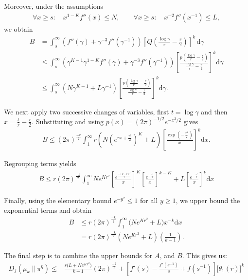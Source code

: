 \documentclass[10pt, journal]{IEEEtran}
\begin{document}
Moreover, under the assumptions
\begin{align*}
\forall x \ge s:\quad x^{1-K} f''(x) \le N,
\qquad
\forall x \ge s:\quad x^{-2} f''(x^{-1}) \le L,
\end{align*}
we obtain
\begin{align}
B &= \int_s^{\infty} \left(f''(\gamma) + \gamma^{-3} f''(\gamma^{-1})\right)
\left[Q\!\left(\tfrac{\log \gamma}{r} - \tfrac{r}{2}\right)\right]^k \, \mathrm{d}\gamma \nonumber \\
&\le \int_s^{\infty} 
\left(\gamma^{K-1} \gamma^{1-K} f''(\gamma) + \gamma^{-3} f''(\gamma^{-1})\right)
\left[\frac{p\!\left(\frac{\log \gamma}{r} - \frac{r}{2}\right)}{\frac{\log \gamma}{r} - \frac{r}{2}}\right]^k
\mathrm{d}\gamma \nonumber \\
&\le \int_s^{\infty} 
\left(N \gamma^{K-1} + L \gamma^{-1}\right)
\left[\frac{p\!\left(\frac{\log \gamma}{r} - \frac{r}{2}\right)}{\frac{\log \gamma}{r} - \frac{r}{2}}\right]^k
\mathrm{d}\gamma.\nonumber
\end{align}

We next apply two successive changes of variables, first $t = \log \gamma$ and then $x = \frac{t}{r} - \frac{r}{2}$. Substituting and using $p(x) = (2\pi)^{-1/2} e^{-x^2/2}$ gives
\begin{align*}
B \le (2\pi)^\frac{-k}{2} \int_{1}^{\infty} r\left(N \left(e^{rx+\frac{r^2}{2}}\right)^{K} + L\right) \left[\frac{\exp\left(-\frac{x^2}{2}\right)}{x}\right]^{k} \mathrm{d}x.
\end{align*}
 
Regrouping terms yields
\begin{align}
B \le r(2\pi)^\frac{-k}{2} \int_{1}^\infty Ne^{Kr^2}\left[\frac{e^{\frac{-(x-r)^2}{2}}}{x}\right]^{K}\left[\frac{e^{-\frac{x^2}{2}}}{x}\right]^{k-K} + L\left[\frac{e^{-\frac{x^2}{2}}}{x}\right]^{k} \mathrm{d}x \nonumber
\end{align}

Finally, using the elementary bound $e^{-y^2} \le 1$ for all $y \ge 1$, we upper bound the exponential terms and obtain
\begin{align}
B &\le r(2\pi)^\frac{-k}{2} \int_{1}^\infty \big(Ne^{Kr^2} + L\big)x^{-k} \mathrm{d}x \nonumber\\
&= r(2\pi)^\frac{-k}{2} \left(Ne^{Kr^2} + L\right) \left(\frac{1}{k-1}\right)\nonumber.
\end{align}

The final step is to combine the upper bounds for $A$, and $B$. This gives us:
\begin{align}
    D_f(\mu_{k} \| \pi^\eta) \leq &\frac{r\big(L + N e^{K r^2}\big)}{k-1} (2\pi)^{\frac{-k}{2}} + \left[ f'(s) - \frac{f'(s^{-1})}{s} + f(s^{-1}) \right] \!\! \Big[\theta_{1}\left(r\right)\Big]^{k} \nonumber
\end{align}
\end{document}
